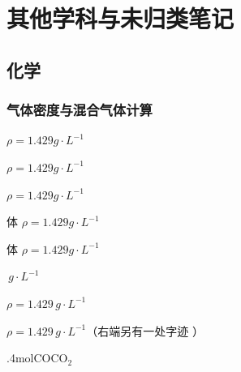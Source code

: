\chapter{其他学科与未归类笔记}
\label{ch:99}

\section{化学}
\subsection{气体密度与混合气体计算}
$\rho=1.429\unit{g\cdot L^{-1}}$

$\rho=1.429\unit{g\cdot L^{-1}}$

$\rho=1.429\unit{g\cdot L^{-1}}$

体 $\rho=1.429\unit{g\cdot L^{-1}}$

体 $\rho=1.429\unit{g\cdot L^{-1}}$

\unclear{$\ldots$}\,$\unit{g\cdot L^{-1}}$

 $\rho=1.429\,\unit{g\cdot L^{-1}}$

 $\rho=1.429\,\unit{g\cdot L^{-1}}$\quad（右端另有一处字迹 ）

.4mol\quad $\mathrm{CO}$\quad $\mathrm{CO_2}$

